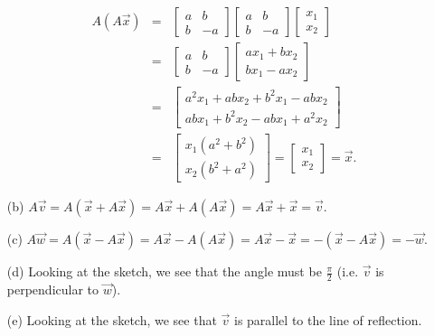 \begin{SaveQuestion}
\begin{enumerate}
			\begin{eqnarray*}
				A(A\vec{x}) & = & \begin{bmatrix}a &b \\ b & -a\end{bmatrix}\begin{bmatrix}a &b \\ b & -a\end{bmatrix}\begin{bmatrix}x_1 \\ x_2\end{bmatrix} \\
				& = & \begin{bmatrix}a &b \\ b & -a\end{bmatrix}\begin{bmatrix}ax_1+bx_2 \\ bx_1-ax_2\end{bmatrix} \\
				& = & \begin{bmatrix}a^2x_1+abx_2+b^2x_1-abx_2 \\ abx_1+b^2x_2-abx_1+a^2x_2\end{bmatrix} \\
				& = & \begin{bmatrix}x_1(a^2+b^2) \\ x_2(b^2+a^2)\end{bmatrix}=\begin{bmatrix}x_1 \\ x_2\end{bmatrix}=\vec{x}.
			\end{eqnarray*}
			\item[(b)] $A\vec{v}=A(\vec{x}+A\vec{x})=A\vec{x}+A(A\vec{x})=A\vec{x}+\vec{x}=\vec{v}$.
			\item[(c)] $A\vec{w}=A(\vec{x}-A\vec{x})=A\vec{x}-A(A\vec{x})=A\vec{x}-\vec{x}=-(\vec{x}-A\vec{x})=-\vec{w}$.
			\item[(d)] Looking at the sketch, we see that the angle must be $\frac{\pi}{2}$ (i.e. $\vec{v}$ is perpendicular to $\vec{w}$).
			\item[(e)] Looking at the sketch, we see that $\vec{v}$ is parallel to the line of reflection.
		\end{enumerate}
\end{SaveQuestion}


